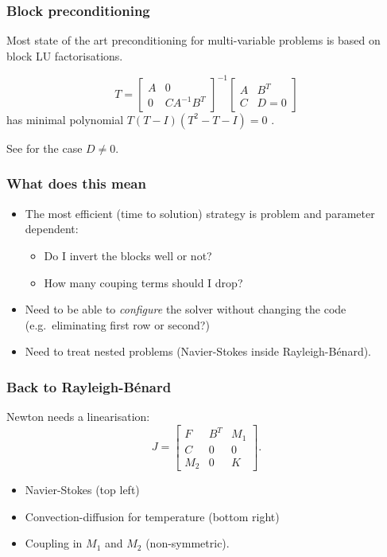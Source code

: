 \documentclass[presentation]{beamer}
\begin{document}
\begin{frame}
  \frametitle{Block preconditioning}
  Most state of the art preconditioning for multi-variable
  problems is based on block LU factorisations.

  \begin{equation*}
    T = \begin{bmatrix}
      A & 0 \\
      0 & C A^{-1} B^T
    \end{bmatrix}^{-1}
    \begin{bmatrix}
      A & B^T \\
      C & D = 0
    \end{bmatrix}
  \end{equation*}
  has minimal polynomial $T(T - I)(T^2 - T - I) =
  0$ \parencite{Murphy:2000}.

  See \textcite{Ipsen:2001} for the case $D \ne 0$.
\end{frame}

\begin{frame}
  \frametitle{What does this mean}
  \begin{itemize}
  \item The most efficient (time to solution) strategy is problem and
    parameter dependent:
    \begin{itemize}
    \item Do I invert the blocks well or not?
    \item How many couping terms should I drop?
    \end{itemize}
  \item Need to be able to \emph{configure} the solver without
    changing the code (e.g.~eliminating first row or second?)
  \item Need to treat nested problems (Navier-Stokes inside Rayleigh-B\'enard).
  \end{itemize}
\end{frame}

\begin{frame}
  \frametitle{Back to Rayleigh-B\'enard}
  Newton needs a linearisation:
  \begin{equation*}
    J = \begin{bmatrix}
      F   & B^T & M_1 \\
      C   & 0   & 0   \\
      M_2 & 0   & K
    \end{bmatrix}.
  \end{equation*}
  \begin{itemize}
  \item Navier-Stokes (top left)
  \item Convection-diffusion for temperature (bottom right)
  \item Coupling in $M_1$ and $M_2$ (non-symmetric).
  \end{itemize}
\end{frame}
\end{document}
